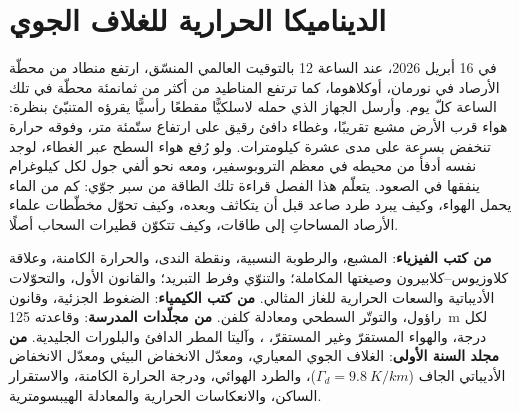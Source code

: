 \chapter{الديناميكا الحرارية للغلاف الجوي}\label{ch:b2:atmospheric-thermodynamics}

في 16 أبريل 2026، عند الساعة 12 بالتوقيت العالمي المنسّق، ارتفع منطاد من محطّة الأرصاد في نورمان، أوكلاهوما، كما
ترتفع المناطيد من أكثر من ثمانمئة محطّة في تلك الساعة كلّ يوم. وأرسل الجهاز الذي
حمله لاسلكيًّا مقطعًا رأسيًّا يقرؤه المتنبّئ بنظرة: هواء قرب الأرض
مشبع تقريبًا، وغطاء دافئ رقيق على ارتفاع ستّمئة متر، وفوقه حرارة تنخفض
بسرعة على مدى عشرة كيلومترات. ولو رُفع هواء السطح عبر الغطاء، لوجد نفسه
أدفأ من محيطه في معظم التروبوسفير، ومعه نحو ألفي جول لكل
كيلوغرام ينفقها في الصعود. يتعلّم هذا الفصل قراءة تلك الطاقة من سبر جوّي: كم من
الماء يحمل الهواء، وكيف يبرد طرد صاعد قبل أن يتكاثف وبعده، وكيف تحوّل مخطّطات
علماء الأرصاد المساحاتِ إلى طاقات، وكيف تتكوّن قطيرات السحاب أصلًا.

\begin{recall}
\textbf{من كتب الفيزياء}:  المشبع، والرطوبة النسبية، ونقطة الندى،
والحرارة الكامنة، وعلاقة كلاوزيوس--كلابيرون وصيغتها المكاملة؛ والتنوّي
وفرط التبريد؛ والقانون الأول، والتحوّلات الأديباتية والسعات الحرارية للغاز المثالي.
\textbf{من كتب الكيمياء}: الضغوط الجزئية، وقانون راؤول، والتوتّر السطحي ومعادلة
كلفن. \textbf{من مجلّدات المدرسة}:  وقاعدته
\qty{125}{m} لكل درجة، والهواء المستقرّ وغير المستقرّ، ، وآليتا المطر الدافئ
والبلورات الجليدية. \textbf{من مجلد السنة الأولى}: الغلاف الجوي المعياري، ومعدّل الانخفاض البيئي
ومعدّل الانخفاض الأديباتي الجاف ($\Gamma_d = \qty{9.8}{K/km}$)، والطرد الهوائي، ودرجة الحرارة
الكامنة، والاستقرار الساكن، والانعكاسات الحرارية والمعادلة الهيبسومترية.
\end{recall}


